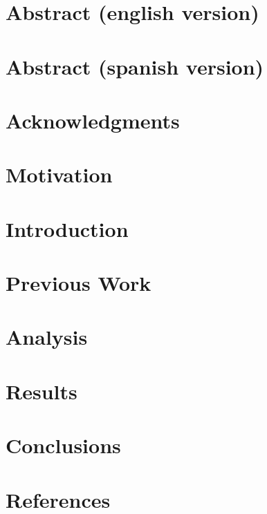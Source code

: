 \documentclass[11pt,a4paper,twosides]{tesis}
\begin{document}
\def\autor{Pablo Agustín Artuso \\ LU: 282/11 \\ artusopablo@gmail.com}
\def\tituloTesis{Studying the logging capability of Windows Telemetry component using Reverse Engineering}
\def\runtitle{}
\def\director{Rodolfo Baader $<$rbaader@dc.uba.ar$>$}
\def\codirector{Aleksandar Milenkoski $<$amilenkoski@ernw.de$>$}
\def\lugar{Buenos Aires, 2019}


\chapter*{Abstract (english version)}
    

\chapter*{Abstract (spanish version)}
    

\chapter*{Acknowledgments}
    

\tableofcontents

\chapter{Motivation}
    

\chapter{Introduction}
    

\chapter{Previous Work}
    

\chapter{Analysis}
    

\chapter{Results}
    

\chapter{Conclusions}
    

\chapter{References}
    
\end{document}
